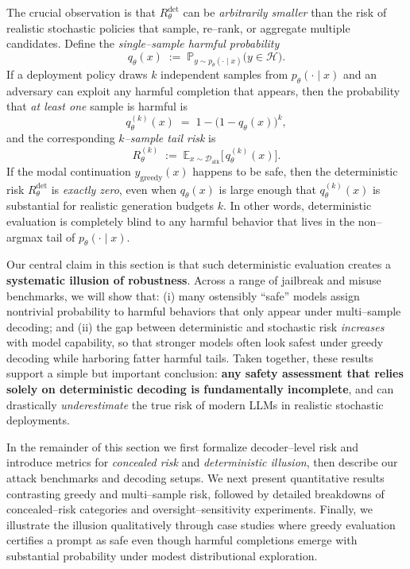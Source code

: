 The crucial observation is that $R_\theta^{\mathrm{det}}$ can be
\emph{arbitrarily smaller} than the risk of realistic stochastic
policies that sample, re--rank, or aggregate multiple candidates.
Define the \emph{single--sample harmful probability}
\[
  q_\theta(x)
  \;:=\;
  \mathbb{P}_{y \sim p_\theta(\cdot \mid x)}
  \big( y \in \mathcal{H} \big).
\]
If a deployment policy draws $k$ independent samples from
$p_\theta(\cdot \mid x)$ and an adversary can exploit any harmful
completion that appears, then the probability that \emph{at least one}
sample is harmful is
\[
  q_\theta^{(k)}(x)
  \;=\;
  1 - \big( 1 - q_\theta(x) \big)^{k},
\]
and the corresponding \emph{$k$--sample tail risk} is
\[
  R_\theta^{(k)}
  \;:=\;
  \mathbb{E}_{x \sim \mathcal{D}_{\text{atk}}}
  \big[\, q_\theta^{(k)}(x) \big].
\]
If the modal continuation $y_{\mathrm{greedy}}(x)$ happens to be safe,
then the deterministic risk $R_\theta^{\mathrm{det}}$ is
\emph{exactly zero}, even when $q_\theta(x)$ is large enough that
$q_\theta^{(k)}(x)$ is substantial for realistic generation
budgets $k$.
In other words, deterministic evaluation is completely blind to any
harmful behavior that lives in the non--argmax tail of
$p_\theta(\cdot \mid x)$.

Our central claim in this section is that such deterministic evaluation
creates a \textbf{systematic illusion of robustness}.
Across a range of jailbreak and misuse benchmarks, we will show that:
(i) many ostensibly ``safe'' models assign nontrivial probability to
harmful behaviors that only appear under multi--sample decoding;
and (ii) the gap between deterministic and stochastic risk
\emph{increases} with model capability, so that stronger models often
look safest under greedy decoding while harboring fatter harmful tails.
Taken together, these results support a simple but important conclusion:
\textbf{any safety assessment that relies solely on deterministic
decoding is fundamentally incomplete}, and can drastically
\emph{underestimate} the true risk of modern LLMs in realistic
stochastic deployments.

In the remainder of this section we first formalize decoder--level risk
and introduce metrics for \emph{concealed risk} and
\emph{deterministic illusion}, then describe our attack benchmarks and
decoding setups.
We next present quantitative results contrasting greedy and multi--sample
risk, followed by detailed breakdowns of concealed--risk categories and
oversight--sensitivity experiments.
Finally, we illustrate the illusion qualitatively through case studies
where greedy evaluation certifies a prompt as safe even though harmful
completions emerge with substantial probability under modest
distributional exploration.

